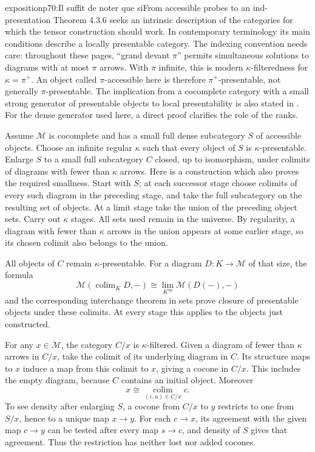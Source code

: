 \begin{dcomment}{exposition}{p70:Il suffit de noter que si}{From accessible probes to an ind-presentation}
Theorem 4.3.6 seeks an intrinsic description of the categories for which the tensor construction should work.  In contemporary terminology its main conditions describe a locally presentable category.  The indexing convention needs care: throughout these pages, ``grand devant $\pi$'' permits simultaneous solutions to diagrams with at most $\pi$ arrows.  With $\pi$ infinite, this is modern $\kappa$-filteredness for $\kappa=\pi^+$.  An object called $\pi$-accessible here is therefore $\pi^+$-presentable, not generally $\pi$-presentable.  The implication from a cocomplete category with a small strong generator of presentable objects to local presentability is also stated in \citet[Theorem 1.20]{AdamekRosicky1994}.  For the dense generator used here, a direct proof clarifies the role of the ranks.

Assume $\mathcal M$ is cocomplete and has a small full dense subcategory $S$ of accessible objects.  Choose an infinite regular $\kappa$ such that every object of $S$ is $\kappa$-presentable.  Enlarge $S$ to a small full subcategory $C$ closed, up to isomorphism, under colimits of diagrams with fewer than $\kappa$ arrows.  Here is a construction which also proves the required smallness.  Start with $S$; at each successor stage choose colimits of every such diagram in the preceding stage, and take the full subcategory on the resulting set of objects.  At a limit stage take the union of the preceding object sets.  Carry out $\kappa$ stages.  All sets used remain in the universe.  By regularity, a diagram with fewer than $\kappa$ arrows in the union appears at some earlier stage, so its chosen colimit also belongs to the union.

All objects of $C$ remain $\kappa$-presentable.  For a diagram $D:K\to\mathcal M$ of that size, the formula
\[
 \mathcal M(\operatorname{colim}_K D,-)
 \cong\operatorname{lim}_{K^{\mathrm{op}}}\mathcal M(D(-),-)
\]
and the corresponding interchange theorem in sets prove closure of presentable objects under these colimits.  At every stage this applies to the objects just constructed.

For any $x\in\mathcal M$, the category $C/x$ is $\kappa$-filtered.  Given a diagram of fewer than $\kappa$ arrows in $C/x$, take the colimit of its underlying diagram in $C$.  Its structure maps to $x$ induce a map from this colimit to $x$, giving a cocone in $C/x$.  This includes the empty diagram, because $C$ contains an initial object.  Moreover
\[
 x\cong\operatorname*{colim}_{(c,u)\in C/x}c.
\]
To see density after enlarging $S$, a cocone from $C/x$ to $y$ restricts to one from $S/x$, hence to a unique map $x\to y$.  For each $c\to x$, its agreement with the given map $c\to y$ can be tested after every map $s\to c$, and density of $S$ gives that agreement.  Thus the restriction has neither lost nor added cocones.


\end{dcomment}
